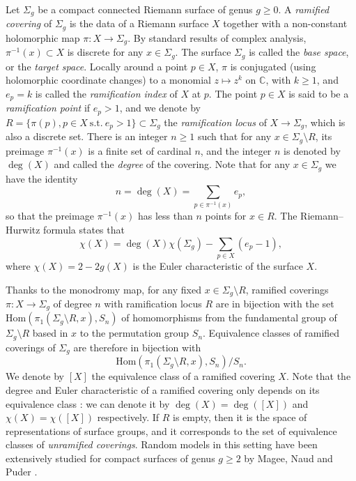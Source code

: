 \documentclass[11pt,a4paper,reqno]{article}
\theoremstyle{definition}
\theoremstyle{remark}
\newcommand\C{\mathbb{C}}
\newcommand\Hom{\mathrm{Hom}}
\begin{document}
Let $\Sigma_g$ be a compact connected Riemann surface of genus $g\geq 0$. A \emph{ramified covering} of $\Sigma_g$ is the data of a Riemann surface $X$ together with a non-constant holomorphic map $\pi:X\to\Sigma_g$. By standard results of complex analysis, $\pi^{-1}(x)\subset X$ is discrete for any $x\in\Sigma_g$. The surface $\Sigma_g$ is called the \emph{base space}, or the \emph{target space}. Locally around a point $p\in X$, $\pi$ is conjugated (using holomorphic coordinate changes) to a monomial $z\mapsto z^k$ on $\C$, with $k\geq 1$, and $e_p=k$ is called the \emph{ramification index} of $X$ at $p$. The point $p\in X$ is said to be a \emph{ramification point} if $e_p>1$, and we denote by $R=\{\pi(p),p\in X\ \text{s.t.}\ e_p>1\}\subset \Sigma_g$ the \emph{ramification locus} of $X\to\Sigma_g$, which is also a discrete set. There is an integer $n\geq 1$ such that for any $x\in\Sigma_g\setminus R$, its preimage $\pi^{-1}(x)$ is a finite set of cardinal $n$, and the integer $n$ is denoted by $\deg(X)$ and called the \emph{degree} of the covering. Note that for any $x\in\Sigma_g$ we have the identity
\[
n=\deg(X)=\sum_{p\in\pi^{-1}(x)}e_p,
\]
so that the preimage $\pi^{-1}(x)$ has less than $n$ points for $x\in R$. The Riemann--Hurwitz formula states that
\begin{equation}\label{eq:Riemann-Hurwitz}
\chi(X)=\deg(X)\chi(\Sigma_g)-\sum_{p\in X}(e_p-1),
\end{equation}
where $\chi(X)=2-2g(X)$ is the Euler characteristic of the surface $X$.

Thanks to the monodromy map, for any fixed $x\in\Sigma_g\setminus R$, ramified coverings $\pi:X\to\Sigma_g$ of degree $n$ with ramification locus $R$ are in bijection with the set $\Hom(\pi_1(\Sigma_g\setminus R,x),S_n)$ of homomorphisms from the fundamental group of $\Sigma_g\setminus R$ based in $x$ to the permutation group $S_n.$ Equivalence classes of ramified coverings of $\Sigma_g$ are therefore in bijection with
\[
\Hom(\pi_1(\Sigma_g\setminus R,x),S_n)/S_n.
\]
We denote by $[X]$ the equivalence class of a ramified covering $X.$ Note that the degree and Euler characteristic of a ramified covering only depends on its equivalence class : we can denote it by $\deg(X) = \deg([X])$ and $\chi(X) = \chi([X])$ respectively.
If $R$ is empty, then it is the space of representations of surface groups, and it corresponds to the set of equivalence classes of \emph{unramified coverings}. Random models in this setting have been extensively studied for compact surfaces of genus $g\geq 2$ by Magee, Naud and Puder \cite{MagPud,MN,MNP}. 
\end{document}
